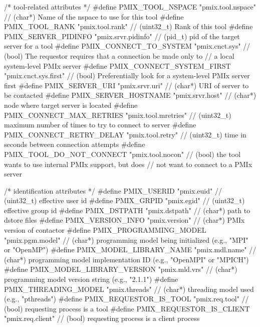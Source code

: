 \begin{codepar}
/* tool-related attributes */
#define PMIX_TOOL_NSPACE                    "pmix.tool.nspace"      // (char*) Name of the nspace to use for this tool
#define PMIX_TOOL_RANK                      "pmix.tool.rank"        // (uint32_t) Rank of this tool
#define PMIX_SERVER_PIDINFO                 "pmix.srvr.pidinfo"     // (pid_t) pid of the target server for a tool
#define PMIX_CONNECT_TO_SYSTEM              "pmix.cnct.sys"         // (bool) The requestor requires that a connection be made only to
                                                                    //        a local system-level PMIx server
#define PMIX_CONNECT_SYSTEM_FIRST           "pmix.cnct.sys.first"   // (bool) Preferentially look for a system-level PMIx server first
#define PMIX_SERVER_URI                     "pmix.srvr.uri"         // (char*) URI of server to be contacted
#define PMIX_SERVER_HOSTNAME                "pmix.srvr.host"        // (char*) node where target server is located
#define PMIX_CONNECT_MAX_RETRIES            "pmix.tool.mretries"    // (uint32_t) maximum number of times to try to connect to server
#define PMIX_CONNECT_RETRY_DELAY            "pmix.tool.retry"       // (uint32_t) time in seconds between connection attempts
#define PMIX_TOOL_DO_NOT_CONNECT            "pmix.tool.nocon"       // (bool) the tool wants to use internal PMIx support, but does
                                                                    //        not want to connect to a PMIx server

/* identification attributes */
#define PMIX_USERID                         "pmix.euid"             // (uint32_t) effective user id
#define PMIX_GRPID                          "pmix.egid"             // (uint32_t) effective group id
#define PMIX_DSTPATH                        "pmix.dstpath"          // (char*) path to dstore files
#define PMIX_VERSION_INFO                   "pmix.version"          // (char*) PMIx version of contactor
#define PMIX_PROGRAMMING_MODEL              "pmix.pgm.model"        // (char*) programming model being initialized (e.g., "MPI" or "OpenMP")
#define PMIX_MODEL_LIBRARY_NAME             "pmix.mdl.name"         // (char*) programming model implementation ID (e.g., "OpenMPI" or "MPICH")
#define PMIX_MODEL_LIBRARY_VERSION          "pmix.mld.vrs"          // (char*) programming model version string (e.g., "2.1.1")
#define PMIX_THREADING_MODEL                "pmix.threads"          // (char*) threading model used (e.g., "pthreads")
#define PMIX_REQUESTOR_IS_TOOL              "pmix.req.tool"         // (bool) requesting process is a tool
#define PMIX_REQUESTOR_IS_CLIENT            "pmix.req.client"       // (bool) requesting process is a client process



\end{codepar}
